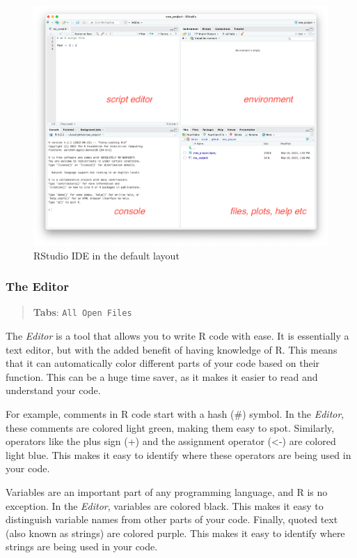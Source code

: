 \documentclass[
]{book}
\begin{document}
\begin{figure}
\includegraphics[width=19.19in]{images/02_021_rstudio_panes} \caption{\label{fig:2021}RStudio IDE in the default layout}\label{fig:2021}
\end{figure}

\hypertarget{the-editor}{%
\subsubsection*{The Editor}\label{the-editor}}

\begin{quote}
\textbf{Tabs}: \texttt{All\ Open\ Files}
\end{quote}

The \emph{Editor} is a tool that allows you to write R code with ease. It is essentially a text editor, but with the added benefit of having knowledge of R. This means that it can automatically color different parts of your code based on their function. This can be a huge time saver, as it makes it easier to read and understand your code.

For example, comments in R code start with a hash (\#) symbol. In the \emph{Editor}, these comments are colored light green, making them easy to spot. Similarly, operators like the plus sign (+) and the assignment operator (\textless-) are colored light blue. This makes it easy to identify where these operators are being used in your code.

Variables are an important part of any programming language, and R is no exception. In the \emph{Editor}, variables are colored black. This makes it easy to distinguish variable names from other parts of your code. Finally, quoted text (also known as strings) are colored purple. This makes it easy to identify where strings are being used in your code.
\end{document}
